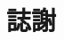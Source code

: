 \documentclass[class=NCU_thesis, crop=false]{standalone}
\begin{document}
\chapter{誌謝}
\end{document}
